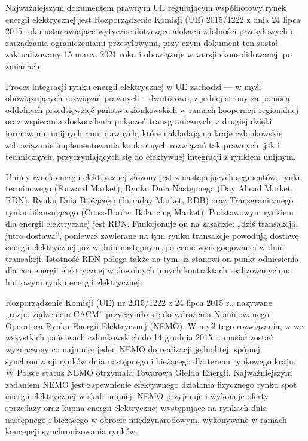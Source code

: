 \documentclass[polish, twoside, 12pt, a4paper]{article}
\theoremstyle{definition}
\theoremstyle{plain}
\theoremstyle{remark}
\begin{document}
Najważniejszym dokumentem prawnym UE regulującym wspólnotowy rynek energii elektrycznej jest Rozporządzenie Komisji (UE) 2015/1222 z dnia 24 lipca 2015 roku \parencite{ec2015} ustanawiające wytyczne dotyczące alokacji zdolności przesyłowych i zarządzania ograniczeniami przesyłowymi, przy czym dokument ten został zaktualizowany 15 marca 2021 roku i obowiązuje w wersji skonsolidowanej, po zmianach. 

Proces integracji rynku energii elektrycznej w UE zachodzi --- w myśl obowiązujących rozwiązań prawnych – dwutorowo, z jednej strony za pomocą oddolnych przedsięwzięć państw członkowskich w ramach kooperacji regionalnej oraz wspierania doskonalenia połączeń transgranicznych, z drugiej dzięki formowaniu unijnych ram prawnych, które nakładają na kraje członkowskie zobowiązanie implementowania konkretnych rozwiązań tak prawnych, jak i technicznych, przyczyniających się do efektywnej integracji z rynkiem unijnym. 

Unijny rynek energii elektrycznej złożony jest z następujących segmentów: rynku terminowego (Forward Market), Rynku Dnia Następnego (Day Ahead Market, RDN), Rynku Dnia Bieżącego (Intraday Market, RDB) oraz Transgranicznego rynku bilansującego (Cross-Border Balancing Market). Podstawowym rynkiem dla energii elektrycznej jest RDN. Funkcjonuje on na zasadzie: „dziś transakcja, jutro dostawa”, ponieważ zawierane na tym rynku transakcje powodują dostawę energii elektrycznej już w dniu następnym, po cenie wynegocjowanej w dniu transakcji. Istotność RDN polega także na tym, iż stanowi on punkt odniesienia dla cen energii elektrycznej w dowolnych innych kontraktach realizowanych na hurtowym rynku energii elektrycznej.

Rozporządzenie Komisji (UE) nr 2015/1222 z 24 lipca 2015 r., nazywane „rozporządzeniem CACM” \parencite{ec2015} przyczyniło się do wdrożenia Nominowanego Operatora Rynku Energii Elektrycznej (NEMO). W myśl tego rozwiązania, w we wszystkich państwach członkowskich do 14 grudnia 2015 r. musiał zostać wyznaczony co najmniej jeden NEMO do realizacji jednolitej, spójnej synchronizacji rynków dnia następnego i bieżącego dla terenu rynkowego kraju. W Polsce status NEMO otrzymała Towarowa Giełda Energii. Najważniejszym zadaniem NEMO jest zapewnienie efektywnego działania fizycznego rynku spot energii elektrycznej w skali unijnej. NEMO przyjmuje i wykonuje oferty sprzedaży oraz kupna energii elektrycznej występujące na rynkach dnia następnego i bieżącego w obrocie międzynarodowym, wykonywane w ramach koncepcji synchronizowania rynków. 
\end{document}
